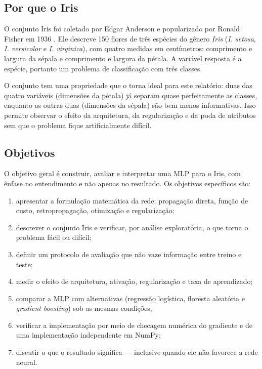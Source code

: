 \subsection{Por que o Iris}

O conjunto Iris foi coletado por Edgar Anderson e popularizado por Ronald Fisher em 1936
\cite{anderson1935,fisher1936}. Ele descreve 150 flores de três espécies do gênero \emph{Iris}
(\emph{I. setosa}, \emph{I. versicolor} e \emph{I. virginica}), com quatro medidas em centímetros:
comprimento e largura da sépala e comprimento e largura da pétala. A variável resposta é a espécie,
portanto um problema de classificação com três classes.

O conjunto tem uma propriedade que o torna ideal para este relatório: duas das quatro variáveis
(dimensões da pétala) já separam quase perfeitamente as classes, enquanto as outras duas
(dimensões da sépala) são bem menos informativas. Isso permite observar o efeito da arquitetura,
da regularização e da poda de atributos sem que o problema fique artificialmente difícil.

\subsection{Objetivos}

O objetivo geral é construir, avaliar e interpretar uma MLP para o Iris, com ênfase no
entendimento e não apenas no resultado. Os objetivos específicos são:

\begin{enumerate}
	\item apresentar a formulação matemática da rede: propagação direta, função de custo,
	      retropropagação, otimização e regularização;
	\item descrever o conjunto Iris e verificar, por análise exploratória, o que torna o problema
	      fácil ou difícil;
	\item definir um protocolo de avaliação que não vaze informação entre treino e teste;
	\item medir o efeito de arquitetura, ativação, regularização e taxa de aprendizado;
	\item comparar a MLP com alternativas (regressão logística, floresta aleatória e
	      \emph{gradient boosting}) sob as mesmas condições;
	\item verificar a implementação por meio de checagem numérica do gradiente e de uma
	      implementação independente em NumPy;
	\item discutir o que o resultado significa --- inclusive quando ele não favorece a rede neural.
\end{enumerate}


